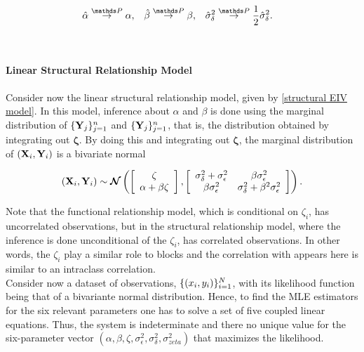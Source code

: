 \documentclass{homework}
\begin{document}
\begin{align}
    \hat{\alpha}  &\overset{\prob}{\rightarrow} \alpha, & \hat{\beta}  &\overset{\prob}{\rightarrow} \beta ,& \hat{\sigma}^2_\delta  &\overset{\prob}{\rightarrow} \frac{1}{2}\hat{\sigma}^2_\delta.
\end{align}

\blank \\

\paragraph{\textbf{Linear Structural Relationship Model}}

Consider now the linear structural relationship model, given by \eqref{structural EIV model}. In this model, inference about $\alpha$ and $\beta$ is done using the marginal distribution of $\{{\bf Y}_j\}_{j=1}^{n}$ and $\{{\bf Y}_j\}_{j=1}^{n}$, that is, the distribution obtained by integrating out $\bm{\zeta}$. By doing this and integrating out $\bm{\zeta}$, the marginal distribution of $({\bf X}_i,{\bf Y}_i)$ is a bivariate normal 

$$
    ({\bf X}_i,{\bf Y}_i) \sim \bm{\mathcal{N}}\left( \left[\begin{array}{c}
         \zeta  \\
         \alpha + \beta \zeta 
    \end{array}\right], \left[\begin{array}{cc}
        \sigma_{\delta}^2 + \sigma_{\epsilon}^2 & \beta \sigma_{\epsilon}^2  \\
        \beta \sigma_{\epsilon}^2 &   \sigma_{\delta}^2 + \beta^2 \sigma_{\epsilon}^2
    \end{array} \right] \right).
$$

Note that the functional relationship model, which is conditional on ${\zeta}_i$, has uncorrelated observations, but in the structural relationship model, where the inference is done unconditional of the $\zeta_i$, has correlated observations. In other words, the $\zeta_i$ play a similar role to blocks and the correlation with appears here is similar to an intraclass correlation. \\

Consider now a dataset of observations, $\{(x_i, y_i)\}_{i=1}^{N}$, with its likelihood function being that of a bivariante normal distribution. Hence, to find the MLE estimators for the six relevant parameters one has to solve a set of five coupled linear equations. Thus, the system is indeterminate and there no unique value for the six-parameter vector $(\alpha, \beta, \zeta, \sigma_{\epsilon}^2, \sigma_{\delta}^2, \sigma_{zeta}^2)$ that maximizes the likelihood. 
\end{document}
